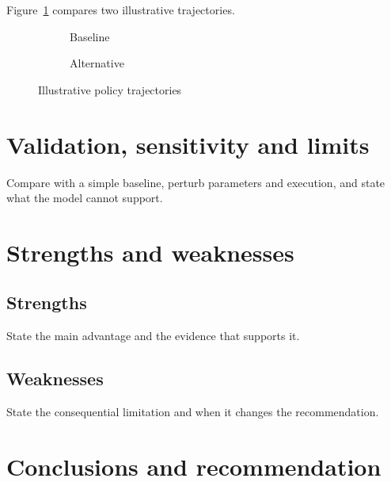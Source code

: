 \documentclass[12pt,a4paper]{article}
\newenvironment{strengths}{\subsection*{Strengths}\itemize}{\enditemize}
\newenvironment{weaknesses}{\subsection*{Weaknesses}\itemize}{\enditemize}
\theoremstyle{definition}\newtheorem{definition}[theorem]{Definition}
\theoremstyle{remark}\newtheorem{remark}[theorem]{Remark}
\begin{document}
Figure~\ref{fig:panels} compares two illustrative trajectories.
\begin{figure}[htbp]\centering
\begin{subfigure}{.47\linewidth}\centering
{}
\caption{Baseline}\end{subfigure}\hfill
\begin{subfigure}{.47\linewidth}\centering
{}
\caption{Alternative}\end{subfigure}
\caption{Illustrative policy trajectories}\label{fig:panels}\end{figure}

\section{Validation, sensitivity and limits}
Compare with a simple baseline, perturb parameters and execution, and state what the model cannot support.

\section{Strengths and weaknesses}
\begin{strengths}
\item State the main advantage and the evidence that supports it.
\end{strengths}
\begin{weaknesses}
\item State the consequential limitation and when it changes the recommendation.
\end{weaknesses}

\section{Conclusions and recommendation}
\end{document}
